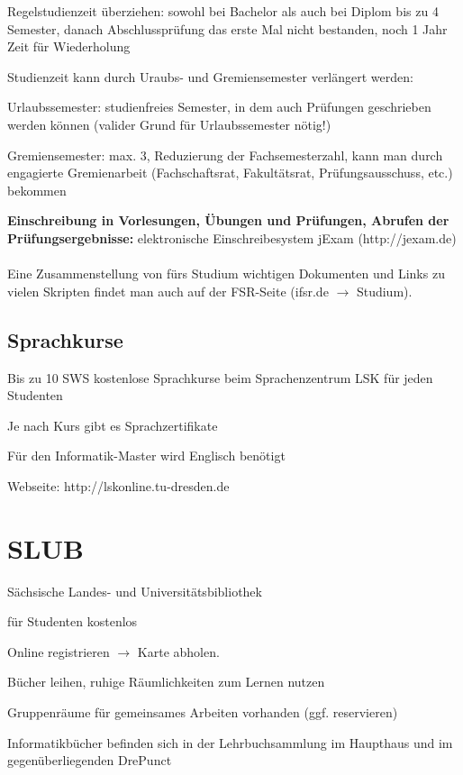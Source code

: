 \documentclass[a4paper,12pt]{report}
\begin{document}
\begin{itemize*}
    \item Regelstudienzeit überziehen: sowohl bei Bachelor als auch bei Diplom bis zu 4 Semester, danach Abschlussprüfung das erste Mal nicht bestanden, noch 1 Jahr Zeit für Wiederholung
    \item Studienzeit kann durch Uraubs- und Gremiensemester verlängert werden:
    \begin{itemize*}
        \item Urlaubssemester: studienfreies Semester, in dem auch Prüfungen geschrieben werden können (valider Grund für Urlaubssemester nötig!)
        \item Gremiensemester: max. 3, Reduzierung der Fachsemesterzahl, kann man durch engagierte Gremienarbeit (Fachschaftsrat, Fakultätsrat, Prüfungsausschuss, etc.) bekommen
    \end{itemize*}
\end{itemize*}

\textbf{Einschreibung in Vorlesungen, Übungen und Prüfungen, Abrufen der Prüfungsergebnisse: }elektronische Einschreibesystem jExam (http://jexam.de)\\\\
Eine Zusammenstellung von fürs Studium wichtigen Dokumenten und Links zu vielen Skripten findet man auch auf der FSR-Seite (ifsr.de $\rightarrow$ Studium).

\subsection{Sprachkurse}
\begin{itemize*}
\item Bis zu 10 SWS kostenlose Sprachkurse beim Sprachenzentrum LSK für jeden Studenten
\item Je nach Kurs gibt es Sprachzertifikate
\item Für den Informatik-Master wird Englisch benötigt
\item Webseite: http://lskonline.tu-dresden.de
\end{itemize*}

\section{SLUB}
\begin{itemize*}
    \item Sächsische Landes- und Universitätsbibliothek
    \item für Studenten kostenlos
    \item Online registrieren $\rightarrow$ Karte abholen.
    \item Bücher leihen, ruhige Räumlichkeiten zum Lernen nutzen
    \item Gruppenräume für gemeinsames Arbeiten vorhanden (ggf. reservieren)
    \item Informatikbücher befinden sich in der Lehrbuchsammlung im Haupthaus und im gegenüberliegenden \glqq DrePunct\grqq
\end{itemize*}
\end{document}
